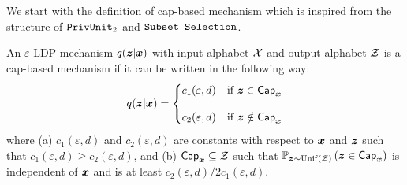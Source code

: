 
We start with the definition of cap-based mechanism which is inspired from the structure of $\texttt{PrivUnit}_2$ and $\texttt{Subset Selection}$.
\begin{definition}\label{def:cap}
An $\varepsilon$-LDP mechanism $q({\boldsymbol{z}} | {\boldsymbol{x}})$ with  input alphabet $\mathcal{X}$ and output alphabet $\mathcal{Z}$ is a cap-based mechanism if it can be written in the following way:
\begin{align}
\textstyle
    q({\boldsymbol{z}} | {\boldsymbol{x}}) = 
    \begin{cases}
      c_1(\varepsilon, d) & \text{if}\ {\boldsymbol{z}} \in \mathsf{Cap}_{{\boldsymbol{x}}}
      \\[10pt]
      c_2(\varepsilon, d) & \text{if}\ {\boldsymbol{z}} \notin \mathsf{Cap}_{{\boldsymbol{x}}}
    \end{cases} \label{eq:cap_mechanism}
\end{align}
where (a) $c_1(\varepsilon, d)$ and $c_2(\varepsilon, d)$ are constants with respect to ${\boldsymbol{x}}$ and ${\boldsymbol{z}}$ such that $c_1(\varepsilon, d) \geq c_2(\varepsilon, d)$, and (b) $\mathsf{Cap}_{{\boldsymbol{x}}} \subseteq \mathcal{Z}$ such that $\mathbb{P}_{{\boldsymbol{z}} \sim \mathrm{Unif}(\mathcal{Z})}\left( {\boldsymbol{z}} \in \mathsf{Cap}_{{\boldsymbol{x}}} \right)$ is independent of ${\boldsymbol{x}}$ and is at least $c_2(\varepsilon, d) / 2 c_1(\varepsilon, d)$.
\end{definition}

